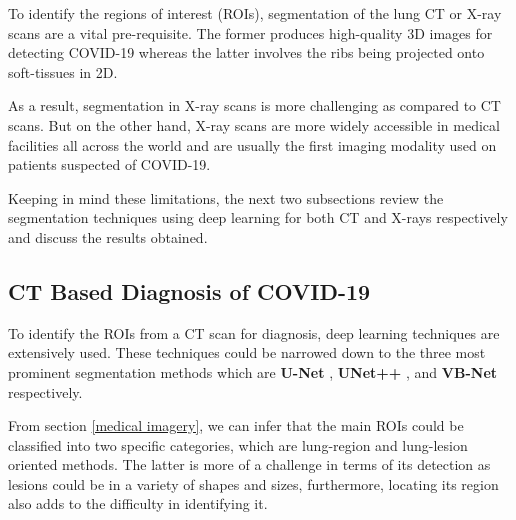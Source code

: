 
To identify the regions of interest (ROIs), segmentation of the 
lung CT or X-ray scans are a vital pre-requisite. The former produces 
high-quality 3D images for detecting COVID-19 whereas the latter involves 
the ribs being projected onto soft-tissues in 2D. 

As a result, segmentation 
in X-ray scans is more challenging as compared to CT scans. But on the other hand, 
X-ray scans are more widely accessible in medical facilities all across the world 
and are usually the first imaging modality used on patients suspected of COVID-19.

Keeping in mind these limitations, the next two subsections review the segmentation techniques using deep learning for both CT and X-rays respectively and 
discuss the results obtained.

\subsection{CT Based Diagnosis of COVID-19}
To identify the ROIs from a CT scan for diagnosis, deep learning 
techniques are extensively used. These techniques could be narrowed down 
to the three most prominent segmentation methods which are \textbf{U-Net} \cite{CXZ+2020, CYZ+2020, HLR+2020, YHQ+2020, GOM+2020, LLL+2020}, \textbf{UNet++} \cite{CJL+2020, JSB+2020}, and \textbf{VB-Net}  \cite{SFY+2020} respectively.


From section \ref{medical imagery}, we can infer that the main ROIs could be classified into 
two specific categories, which are lung-region and lung-lesion oriented 
methods. The latter is more of a challenge in terms of its detection as lesions 
could be in a variety of shapes and sizes, furthermore, locating its region 
also adds to the difficulty in identifying it.

